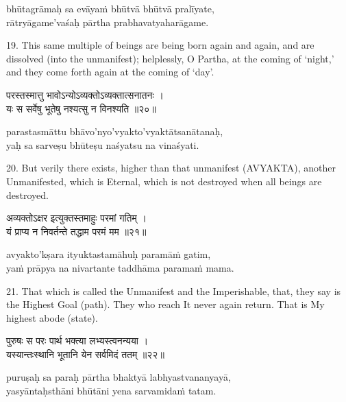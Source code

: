 \begin{transliteration}
bhūtagrāmaḥ sa evāyaṁ bhūtvā bhūtvā pralīyate, \\
rātryāgame'vaśaḥ pārtha prabhavatyaharāgame.
\end{transliteration}

19. This same multiple of beings are being born again and again, and are
dissolved (into the unmanifest); helplessly, O Partha, at the coming of
`night,' and they come forth again at the coming of `day'.

\begin{gitaverse}
परस्तस्मात्तु भावोऽन्योऽव्यक्तोऽव्यक्तात्सनातनः । \\
यः स सर्वेषु भूतेषु नश्यत्सु न विनश्यति ॥२०॥
\end{gitaverse}

\begin{transliteration}
parastasmāttu bhāvo'nyo'vyakto'vyaktātsanātanaḥ, \\
yaḥ sa sarveṣu bhūteṣu naśyatsu na vinaśyati.
\end{transliteration}

20. But verily there exists, higher than that unmanifest (AVYAKTA), another
Unmanifested, which is Eternal, which is not destroyed when all beings are
destroyed.

\begin{gitaverse}
अव्यक्तोऽक्षर इत्युक्तस्तमाहुः परमां गतिम् । \\
यं प्राप्य न निवर्तन्ते तद्धाम परमं मम ॥२१॥
\end{gitaverse}

\begin{transliteration}
avyakto'kṣara ityuktastamāhuḥ paramāṁ gatim, \\
yaṁ prāpya na nivartante taddhāma paramaṁ mama.
\end{transliteration}

21. That which is called the Unmanifest and the Imperishable, that, they say is
the Highest Goal (path). They who reach It never again return. That is My
highest abode (state).

\begin{gitaverse}
पुरुषः स परः पार्थ भक्त्या लभ्यस्त्वनन्यया । \\
यस्यान्तःस्थानि भूतानि येन सर्वमिदं ततम् ॥२२॥
\end{gitaverse}

\begin{transliteration}
puruṣaḥ sa paraḥ pārtha bhaktyā labhyastvananyayā, \\
yasyāntaḥsthāni bhūtāni yena sarvamidaṁ tatam.
\end{transliteration}

